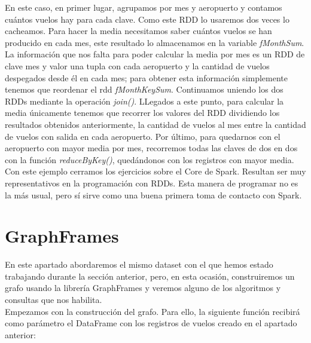 En este caso, en primer lugar, agrupamos por mes y aeropuerto y contamos cuántos vuelos hay para cada clave. Como este RDD lo usaremos dos veces lo cacheamos. Para hacer la media necesitamos saber cuántos vuelos se han producido en cada mes, este resultado lo almacenamos en la variable \textit{fMonthSum}. La información que nos falta para poder calcular la media por mes es un RDD de clave mes y valor una tupla con cada aeropuerto y la cantidad de vuelos despegados desde él en cada mes; para obtener esta información simplemente tenemos que reordenar el rdd \textit{fMonthKeySum}. Continuamos uniendo los dos RDDs mediante la operación \textit{join()}. LLegados a este punto, para calcular la media únicamente tenemos que recorrer los valores del RDD dividiendo los resultados obtenidos anteriormente, la cantidad de vuelos al mes entre la cantidad de vuelos con salida en cada aeropuerto. Por último, para quedarnos con el aeropuerto con mayor media por mes, recorremos todas las claves de dos en dos con la función \textit{reduceByKey()}, quedándonos con los registros con mayor media.\\

Con este ejemplo cerramos los ejercicios sobre el Core de Spark. Resultan ser muy representativos en la programación con RDDs. Esta manera de programar no es la más usual, pero sí sirve como una buena primera toma de contacto con Spark.\\

\section{GraphFrames}

En este apartado abordaremos el mismo dataset con el que hemos estado trabajando durante la sección anterior, pero, en esta ocasión, construiremos un grafo usando la librería GraphFrames y veremos alguno de los algoritmos y consultas que nos habilita.\\

Empezamos con la construcción del grafo. Para ello, la siguiente función recibirá como parámetro el DataFrame con los registros de vuelos creado en el apartado anterior:\\

